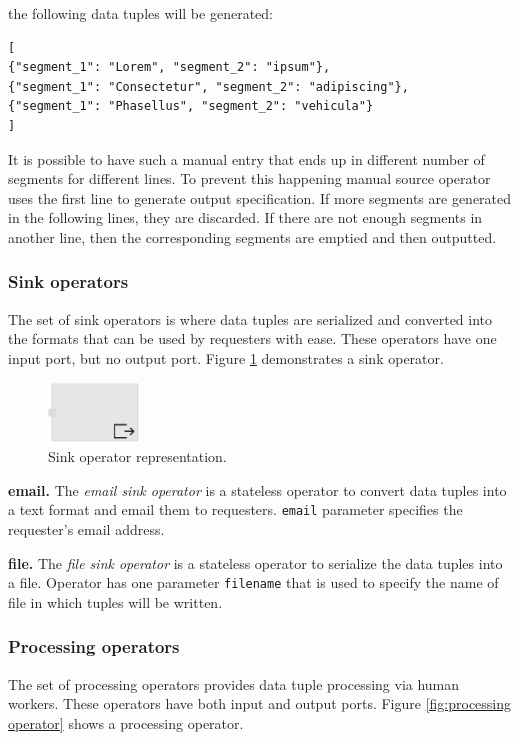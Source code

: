 \noindent the following data tuples will be generated:

\begin{lstlisting}
[
{"segment_1": "Lorem", "segment_2": "ipsum"},
{"segment_1": "Consectetur", "segment_2": "adipiscing"},
{"segment_1": "Phasellus", "segment_2": "vehicula"}
]
\end{lstlisting}

It is possible to have such a manual entry that ends up in different number of segments 
for different lines. To prevent this happening manual source operator uses the first line 
to generate output specification. If more segments are generated in the following lines, 
they are discarded. If there are not enough segments in another line, then the corresponding 
segments are emptied and then outputted.

\subsubsection{Sink operators}
The set of sink operators is where data tuples are serialized and converted into 
the formats that can be used by requesters with ease. These operators have one 
input port, but no output port. Figure \ref{fig:sink operator} demonstrates a sink operator.

\begin{figure}[ht]
	\centering
	\includegraphics[height=60px]{figures/SinkOperator.pdf}
	\caption{Sink operator representation.}
	\label{fig:sink operator}
\end{figure}

\textbf{email.}
The \textit{email sink operator} is a stateless operator to convert data tuples into a 
text format and email them to requesters. \texttt{email} parameter specifies the 
requester's email address. 

\textbf{file.}
The \textit{file sink operator} is a stateless operator to serialize the data tuples into 
a file. Operator has one parameter \texttt{filename} that is used to specify the name 
of file in which tuples will be written.

\subsubsection{Processing operators}
The set of processing operators provides data tuple processing via human workers. 
These operators have both input and output ports. Figure \ref{fig:processing operator} 
shows a processing operator.


